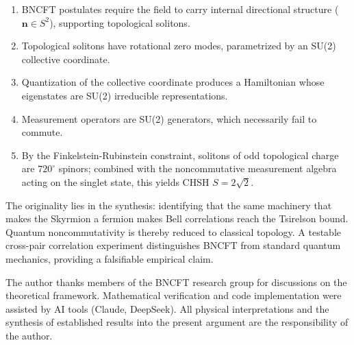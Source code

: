 \documentclass[11pt,a4paper]{article}
\begin{document}
\begin{enumerate}
\item BNCFT postulates require the field to carry internal directional structure ($\mathbf{n} \in S^2$), supporting topological solitons.
\item Topological solitons have rotational zero modes, parametrized by an SU(2) collective coordinate.
\item Quantization of the collective coordinate produces a Hamiltonian whose eigenstates are SU(2) irreducible representations.
\item Measurement operators are SU(2) generators, which necessarily fail to commute.
\item By the Finkelstein-Rubinstein constraint, solitons of odd topological charge are $720^\circ$ spinors; combined with the noncommutative measurement algebra acting on the singlet state, this yields CHSH $S = 2\sqrt{2}$.
\end{enumerate}

The originality lies in the synthesis: identifying that the same machinery that makes the Skyrmion a fermion makes Bell correlations reach the Tsirelson bound. Quantum noncommutativity is thereby reduced to classical topology. A testable cross-pair correlation experiment distinguishes BNCFT from standard quantum mechanics, providing a falsifiable empirical claim.

\begin{acknowledgments}
The author thanks members of the BNCFT research group for discussions on the theoretical framework. Mathematical verification and code implementation were assisted by AI tools (Claude, DeepSeek). All physical interpretations and the synthesis of established results into the present argument are the responsibility of the author.
\end{acknowledgments}
\end{document}
